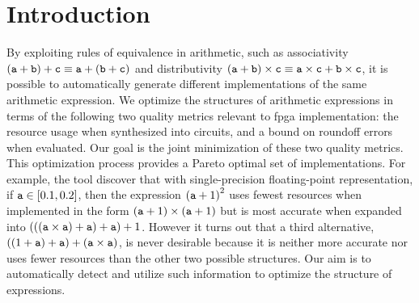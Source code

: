 \section{Introduction}
\label{so:sec:introduction}


By exploiting rules of equivalence in arithmetic, such as associativity $(\texttt{a}
+ \texttt{b}) + \texttt{c} \equiv \texttt{a} + (\texttt{b} + \texttt{c})$ and distributivity $(\texttt{a}
+ \texttt{b}) \times \texttt{c} \equiv \texttt{a} \times \texttt{c} + \texttt{b} \times \texttt{c}$, it
is possible to automatically generate different implementations of the same
arithmetic expression.  We optimize the structures of arithmetic expressions
in terms of the following two quality metrics relevant to \gls{fpga}
implementation: the resource usage when synthesized into circuits, and a bound
on roundoff errors when evaluated. Our goal is the joint minimization of these
two quality metrics.  This optimization process provides a Pareto optimal set
of implementations.  For example, the tool discover that with single-precision
floating-point representation, if $\texttt{a} \in [0.1, 0.2]$, then the expression
${(\texttt{a} + 1)}^2$ uses fewest resources when implemented in the form $(\texttt{a} +
1) \times (\texttt{a} + 1)$ but is most accurate when expanded into $(((\texttt{a} \times
\texttt{a}) + \texttt{a}) + \texttt{a}) + 1$.  However it turns out that a third alternative,
$((1 + \texttt{a}) + \texttt{a}) + (\texttt{a} \times \texttt{a})$, is never desirable because it
is neither more accurate nor uses fewer resources than the other two possible
structures. Our aim is to automatically detect and utilize such information to
optimize the structure of expressions.

